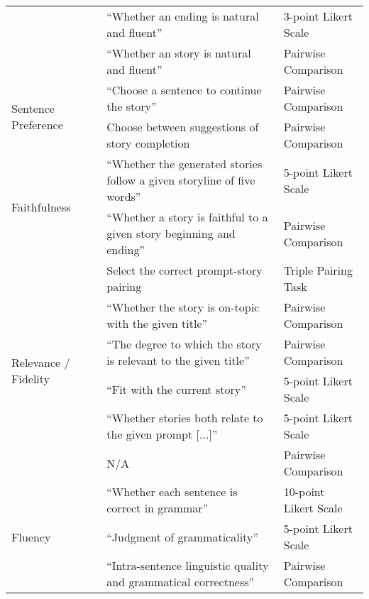 {\begin{landscape}
\begin{table}
\begin{tabular}{llll}
                & \citet{guan2019story} & ``Whether an ending is natural and fluent'' & 3-point Likert Scale \\
                & \citet{guan-etal-2020-knowledge} & ``Whether an story is natural and fluent'' & Pairwise Comparison \\
                \midrule
                \multirow{2}{*}{Sentence Preference} & \citet{clark-etal-2018-neural} & ``Choose a sentence to continue the story'' & Pairwise Comparison \\
                & \citet{clark-smith-2021-choose} & Choose between suggestions of story completion & Pairwise Comparison \\
                \midrule
                \multirow{2}{*}{Faithfulness} & \citet{peng-etal-2018-towards} & ``Whether the generated stories follow a given storyline of five words'' & 5-point Likert Scale \\
                & \citet{wang2020narrative} & ``Whether a story is faithful to a given story beginning and ending'' & Pairwise Comparison \\
                \midrule
                \multirow{6}{*}{Relevance / Fidelity} & \citet{fan2018hierarchical} & Select the correct prompt-story pairing & Triple Pairing Task \\
                & \citet{yao2019plan} & ``Whether the story is on-topic with the given title'' & Pairwise Comparison \\
                & \citet{jhamtani-berg-kirkpatrick-2020-narrative} & ``The degree to which the story is relevant to the given title'' & Pairwise Comparison \\
                & \citet{akoury2020storium} & ``Fit with the current story'' & 5-point Likert Scale \\
                & \citet{goldfarb-tarrant-etal-2020-content} & ``Whether stories both relate to the given prompt [...]'' & 5-point Likert Scale \\
                & \citet{bai2021semantics} & N/A & Pairwise Comparison \\
                \midrule
                \multirow{6}{*}{Fluency} & \citet{xu-etal-2018-skeleton} & ``Whether each sentence is correct in grammar'' & 10-point Likert Scale \\
                & \citet{akoury2020storium} & ``Judgment of grammaticality'' & 5-point Likert Scale \\
                & \citet{guan2021long} & ``Intra-sentence linguistic quality and grammatical correctness'' & Pairwise Comparison \\

\end{tabular}
\end{table}
\end{landscape}}
